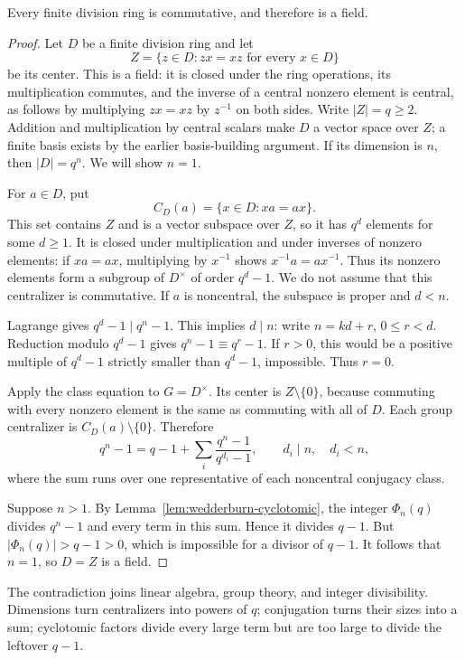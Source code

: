 \begin{theorem}
\label{thm:little-wedderburn}
Every finite division ring is commutative, and therefore is a field.
\end{theorem}
\begin{proof}
Let $D$ be a finite division ring and let
\[
Z=\{z\in D:zx=xz\text{ for every }x\in D\}
\]
be its center. This is a field: it is closed under the ring operations,
its multiplication commutes, and the inverse of a central nonzero
element is central, as follows by multiplying $zx=xz$ by $z^{-1}$
on both sides. Write $|Z|=q\ge2$. Addition and multiplication by
central scalars make $D$ a vector space over $Z$; a finite basis exists
by the earlier basis-building argument. If its dimension is $n$, then
$|D|=q^n$. We will show $n=1$.

For $a\in D$, put
\[
C_D(a)=\{x\in D:xa=ax\}.
\]
This set contains $Z$ and is a vector subspace over $Z$, so it has
$q^d$ elements for some $d\ge1$. It is closed under multiplication
and under inverses of nonzero elements: if $xa=ax$, multiplying by
$x^{-1}$ shows $x^{-1}a=ax^{-1}$. Thus its nonzero elements form
a subgroup of $D^\times$ of order $q^d-1$. We do not assume that
this centralizer is commutative. If $a$ is noncentral, the subspace
is proper and $d<n$.

Lagrange gives $q^d-1\mid q^n-1$. This implies $d\mid n$:
write $n=kd+r$, $0\le r<d$. Reduction modulo $q^d-1$ gives
$q^n-1\equiv q^r-1$. If $r>0$, this would be a positive multiple
of $q^d-1$ strictly smaller than $q^d-1$, impossible. Thus $r=0$.

Apply the class equation to $G=D^\times$. Its center is $Z\setminus\{0\}$,
because commuting with every nonzero element is the same as commuting
with all of $D$. Each group centralizer is
$C_D(a)\setminus\{0\}$. Therefore
\[
q^n-1=q-1+\sum_i\frac{q^n-1}{q^{d_i}-1},
\qquad d_i\mid n,\quad d_i<n,
\]
where the sum runs over one representative of each noncentral
conjugacy class.

Suppose $n>1$. By Lemma~\ref{lem:wedderburn-cyclotomic}, the integer
$\Phi_n(q)$ divides $q^n-1$ and every term in this sum. Hence it
divides $q-1$. But $|\Phi_n(q)|>q-1>0$, which is impossible for a
divisor of $q-1$. It follows that $n=1$, so $D=Z$ is a field.
\end{proof}

\begin{bigidea}
The contradiction joins linear algebra, group theory, and integer
divisibility. Dimensions turn centralizers into powers of $q$; conjugation
turns their sizes into a sum; cyclotomic factors divide every large term
but are too large to divide the leftover $q-1$.
\end{bigidea}

